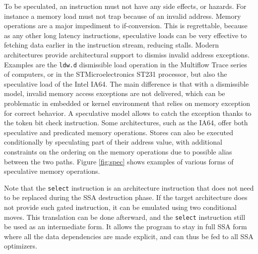 To be speculated, an instruction must not have any side effects, or hazards. For instance a memory load must not trap because of an invalid address. 
Memory operations are  a major impediment to if-conversion. This is regrettable, because as any other long latency instructions, speculative loads can be very effective to fetching data earlier in the instruction stream, reducing stalls. Modern architectures provide architectural support to dismiss invalid address exceptions. Examples are the \texttt{ldw.d} dismissible load operation in the Multiflow Trace series of computers, or in the STMicroelectronics ST231 processor, but also the speculative load of the Intel IA64. The main difference is that with a dismissible model, invalid memory access exceptions are not delivered, which can be problematic in embedded or kernel environment that relies on memory exception for correct behavior. A speculative model allows to catch the exception thanks to the token bit check instruction. Some architectures, such as the IA64, offer both speculative and predicated memory operations.
%
Stores can also be executed conditionally by speculating part of their address value, with additional constraints on the ordering on the memory operations due to possible alias between the two paths. Figure \ref{fig:spec} shows examples of various forms of speculative memory operations.

Note that the \texttt{select} instruction is an architecture instruction that does not need to be replaced during the SSA destruction phase. If the target architecture does not provide such gated instruction, it can be emulated using two conditional moves. This translation can be done afterward, and the \texttt{select} instruction still be used as an intermediate form. It allows the program to stay in full SSA form where all the data dependencies are made explicit, and can thus be fed to all SSA optimizers. 

